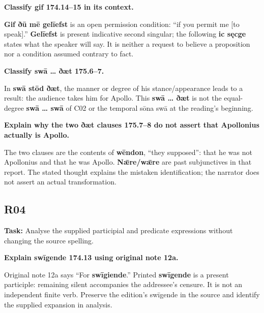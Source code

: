 \textbf{Classify gif 174.14–15 in its context.}

\textbf{Gif ðū mē gelīefst} is an open permission condition: “if you permit me [to speak].” \textbf{Gelīefst} is present indicative second singular; the following \textbf{ic sęcge} states what the speaker will say. It is neither a request to believe a proposition nor a condition assumed contrary to fact.

\textbf{Classify swā … ðæt 175.6–7.}

In \textbf{swā stōd ðæt}, the manner or degree of his stance/\allowbreak{}appearance leads to a result: the audience takes him for Apollo. This \textbf{swā … ðæt} is not the equal-degree \textbf{swā … swā} of C02 or the temporal sōna swā at the reading's beginning.

\textbf{Explain why the two ðæt clauses 175.7–8 do not assert that Apollonius actually is Apollo.}

The two clauses are the contents of \textbf{wēndon}, “they supposed”: that he was not Apollonius and that he was Apollo. \textbf{Nǣre/\allowbreak{}wǣre} are past subjunctives in that report. The stated thought explains the mistaken identification; the narrator does not assert an actual transformation.

\subsection*{R04}

\textbf{Task:} Analyse the supplied participial and predicate expressions without changing the source spelling.

\textbf{Explain swīgende 174.13 using original note 12a.}

Original note 12a says “For \textbf{swīgiende}.” Printed \textbf{swīgende} is a present participle: remaining silent accompanies the addressee's censure. It is not an independent finite verb. Preserve the edition's swīgende in the source and identify the supplied expansion in analysis.


